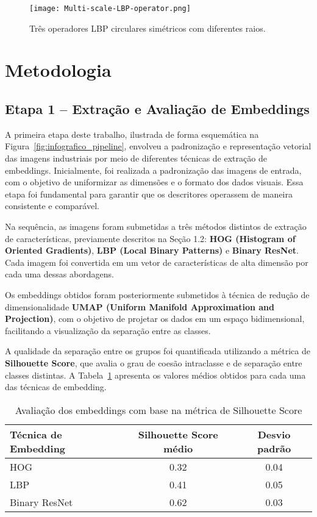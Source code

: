 \documentclass[12pt]{article}
\begin{document}
\begin{figure}[H]
    \centering
    \texttt{[image: Multi-scale-LBP-operator.png]}
    \caption{Três operadores LBP circulares simétricos com diferentes raios.}
    \label{fig:3LBPoperator}
\end{figure}


\section{Metodologia}
\subsection*{Etapa 1 – Extração e Avaliação de Embeddings}

A primeira etapa deste trabalho, ilustrada de forma esquemática na Figura~\ref{fig:infografico_pipeline}, envolveu a padronização e representação vetorial das imagens industriais por meio de diferentes técnicas de extração de embeddings. Inicialmente, foi realizada a padronização das imagens de entrada, com o objetivo de uniformizar as dimensões e o formato dos dados visuais. Essa etapa foi fundamental para garantir que os descritores operassem de maneira consistente e comparável.

Na sequência, as imagens foram submetidas a três métodos distintos de extração de características, previamente descritos na Seção 1.2: \textbf{HOG (Histogram of Oriented Gradients)}, \textbf{LBP (Local Binary Patterns)} e \textbf{Binary ResNet}. Cada imagem foi convertida em um vetor de características de alta dimensão por cada uma dessas abordagens. 

Os embeddings obtidos foram posteriormente submetidos à técnica de redução de dimensionalidade \textbf{UMAP (Uniform Manifold Approximation and Projection)}, com o objetivo de projetar os dados em um espaço bidimensional, facilitando a visualização da separação entre as classes.

A qualidade da separação entre os grupos foi quantificada utilizando a métrica de \textbf{Silhouette Score}, que avalia o grau de coesão intraclasse e de separação entre classes distintas. A Tabela~\ref{tab:avaliacao_embeddings} apresenta os valores médios obtidos para cada uma das técnicas de embedding.

\begin{table}[H]
\centering
\caption{Avaliação dos embeddings com base na métrica de Silhouette Score}
\label{tab:avaliacao_embeddings}
\begin{tabular}{lcc}
\toprule
\textbf{Técnica de Embedding} & \textbf{Silhouette Score médio} & \textbf{Desvio padrão} \\
\midrule
HOG         & 0.32 & 0.04 \\
LBP         & 0.41 & 0.05 \\
Binary ResNet & 0.62 & 0.03 \\
\bottomrule
\end{tabular}
\end{table}
\end{document}
